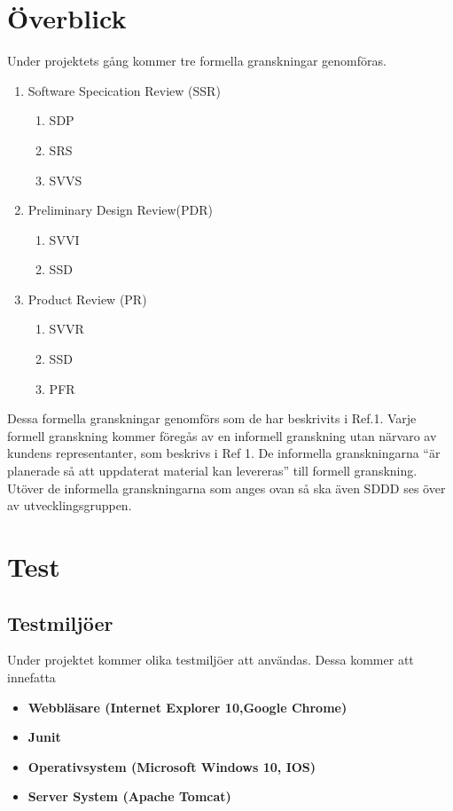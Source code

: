 \documentclass[paper=a4, fontsize=11pt,twoside]{article}
\begin{document}
\section{Överblick}   %
Under projektets gång kommer tre formella granskningar genomföras.
\begin{enumerate}
\item Software Specication Review (SSR)
	\begin{enumerate}
	\item SDP
	\item SRS
	\item SVVS
	\end{enumerate}
\item Preliminary Design Review(PDR)
	\begin{enumerate}
	\item SVVI
	\item SSD
	\end{enumerate}
\item Product Review (PR)
	\begin{enumerate}
	\item SVVR
	\item SSD
	\item PFR
	\end{enumerate}
\end{enumerate}
Dessa formella granskningar genomförs som de har beskrivits i Ref.1. Varje
formell granskning kommer föregås av en informell granskning utan närvaro av
kundens representanter, som beskrivs i Ref 1. De informella granskningarna “är
planerade så att uppdaterat material kan levereras” till formell granskning.
Utöver de informella granskningarna som anges ovan så ska även SDDD ses över av
utvecklingsgruppen.
\section{Test}

\subsection{Testmiljöer}

Under projektet kommer olika testmiljöer att användas. Dessa kommer att innefatta

\begin{itemize}
\item \textbf{Webbläsare (Internet Explorer 10,Google Chrome)}
\item \textbf{Junit}
\item \textbf{Operativsystem (Microsoft Windows 10, IOS)}
\item \textbf{Server System (Apache Tomcat)}
\end{itemize}
\end{document}
